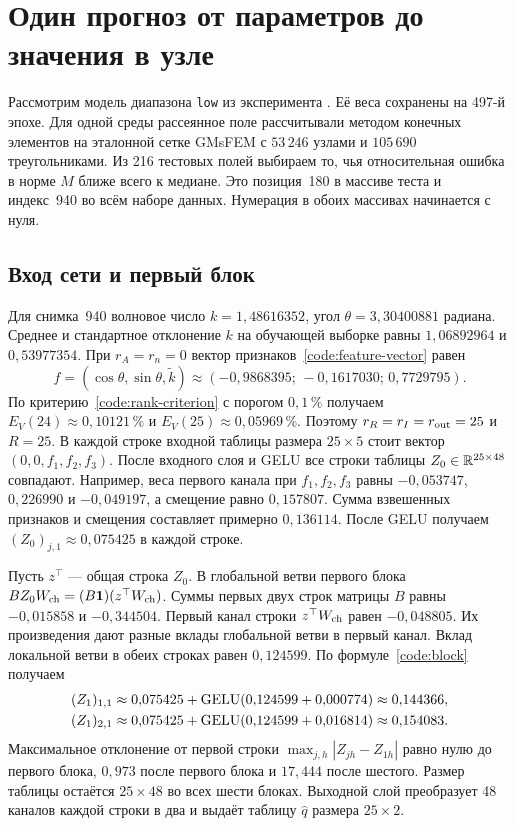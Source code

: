 \chapter{Один прогноз от параметров до значения в узле}
\label{walk:chapter}

Рассмотрим модель диапазона \texttt{low} из эксперимента
\mbox{}. Её веса сохранены
на 497-й эпохе. Для одной среды
рассеянное поле рассчитывали методом конечных элементов на эталонной сетке
GMsFEM с $53\,246$ узлами и $105\,690$ треугольниками. Из 216 тестовых
полей выбираем то, чья относительная ошибка в норме $M$ ближе всего
к медиане. Это позиция~180 в массиве теста и индекс~940 во всём наборе
данных. Нумерация в обоих массивах начинается с нуля.

\section{Вход сети и первый блок}

Для снимка~940 волновое число $k=1{,}48616352$, угол
$\theta=3{,}30400881$ радиана. Среднее и стандартное отклонение $k$
на обучающей выборке равны $1{,}06892964$ и $0{,}53977354$.
При \mbox{$r_A=r_n=0$} вектор признаков~\eqref{code:feature-vector} равен
\[
 f=(\cos\theta,\sin\theta,\widetilde k)
    \approx(-0{,}9868395;\,-0{,}1617030;\,0{,}7729795).
\]
По критерию~\eqref{code:rank-criterion} с порогом $0{,}1\,\%$
получаем $E_V(24)\approx0{,}10121\,\%$ и $E_V(25)\approx0{,}05969\,\%$.
Поэтому $r_R=r_I=r_{\rm out}=25$ и $R=25$.
В каждой строке входной таблицы размера $25\times5$ стоит вектор
$(0,0,f_1,f_2,f_3)$. После входного слоя и GELU все строки
таблицы $Z_0\in\mathbb{R}^{25\times48}$ совпадают. Например, веса первого
канала при $f_1,f_2,f_3$ равны $-0{,}053747$, $0{,}226990$ и
$-0{,}049197$, а смещение равно $0{,}157807$. Сумма взвешенных
признаков и смещения составляет примерно $0{,}136114$. После GELU получаем
$(Z_0)_{j,1}\approx0{,}075425$ в каждой строке.

Пусть $z^\top$ --- общая строка $Z_0$. В глобальной ветви
первого блока $BZ_0 W_{\rm ch}=(B\bm 1)(z^\top W_{\rm ch})$.
Суммы первых двух строк матрицы $B$ равны $-0{,}015858$ и
$-0{,}344504$. Первый канал строки $z^\top W_{\rm ch}$ равен
$-0{,}048805$. Их произведения дают разные вклады глобальной ветви
в первый канал. Вклад локальной ветви в обеих строках равен
$0{,}124599$. По формуле~\eqref{code:block} получаем
\begin{align*}
 (Z_1)_{1,1}&\approx0{,}075425+\operatorname{GELU}(0{,}124599+0{,}000774)\approx0{,}144366,\\
 (Z_1)_{2,1}&\approx0{,}075425+\operatorname{GELU}(0{,}124599+0{,}016814)\approx0{,}154083 .
\end{align*}
Максимальное отклонение от первой строки
$\max_{j,h}|Z_{jh}-Z_{1h}|$ равно нулю до первого блока,
$0{,}973$ после первого блока и $17{,}444$ после шестого.
Размер таблицы остаётся $25\times48$ во всех шести блоках.
Выходной слой преобразует 48 каналов каждой строки в два
и выдаёт таблицу $\widehat q$ размера $25\times2$.

